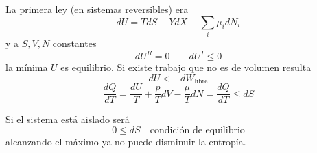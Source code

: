 \documentclass[10pt,oneside]{CBFT_book}
\begin{document}
La primera ley (en sistemas reversibles) era 
\[
	dU = TdS + YdX + \sum_i \mu_i dN_i
\]
y a $S,V,N$ constantes 
\[
	dU^R = 0 \qquad dU^I \leq 0
\]
la mínima $U$ es equilibrio.
Si existe trabajo que no es de volumen resulta 
\[
	dU < -dW_\text{libre}
\]
\[
	\frac{dQ}{dT} = \frac{dU}{T} + \frac{p}{T}dV - \frac{\mu}{T}dN = \frac{dQ}{dT} \leq dS
\]

Si el sistema está aislado será
\[
	0 \leq dS \quad \text{condición de equilibrio}
\]
alcanzando el máximo ya no puede disminuir la entropía.


% 
% 
% 
\end{document}
